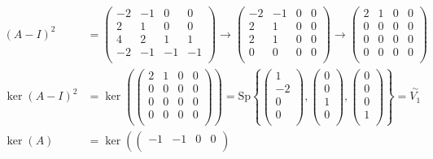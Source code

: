 \documentclass[11pt,a4paper]{article}
\theoremstyle{plain}
\newcommand{\Sp}{\text{Sp}}
\begin{document}
	\begin{align*}
		(A-I)^2 &= 
	\begin{pmatrix}
		-2 & -1 & 0 & 0\\
		2 & 1 & 0 & 0\\
		4 & 2 & 1 & 1\\
		-2 & -1 & -1 & -1\\
	\end{pmatrix} \to
	\begin{pmatrix}
		-2 & -1 & 0 & 0\\
		2 & 1 & 0 & 0\\
		2 & 1 & 0 & 0\\
		0 & 0 & 0 & 0\\
	\end{pmatrix} \to
	\begin{pmatrix}
		2 & 1 & 0 & 0\\
		0 & 0 & 0 & 0\\
		0 & 0 & 0 & 0\\
		0 & 0 & 0 & 0\\
	\end{pmatrix} \\
	\ker(A-I)^2 &= \ker\left(
		\begin{pmatrix}
		2 & 1 & 0 & 0\\
		0 & 0 & 0 & 0\\
		0 & 0 & 0 & 0\\
		0 & 0 & 0 & 0\\
		\end{pmatrix}\right) = 
		\Sp
		\left\{ \begin{pmatrix} 1\\ -2\\ 0\\ 0\\ \end{pmatrix},
		   \begin{pmatrix} 0\\ 0\\ 1\\ 0\\ \end{pmatrix},
		   \begin{pmatrix} 0\\ 0\\ 0\\ 1\\ \end{pmatrix} \right\} = 
		   \overset{\sim}{V_1} \\
	\ker(A) &= \ker\left(
		\begin{pmatrix}
			-1 & -1 & 0 & 0\\

\end{pmatrix}
\end{align*}
\end{document}
